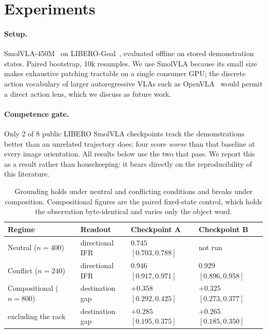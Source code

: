\documentclass{article}
\begin{document}
\section{Experiments}
\label{sec:exp}

\paragraph{Setup.} SmolVLA-450M~\citep{smolvla} on LIBERO-Goal~\citep{libero}, evaluated
offline on stored demonstration states. Paired bootstrap, 10k resamples. We use SmolVLA
because its small size makes exhaustive patching tractable on a single consumer GPU; the
discrete action vocabulary of larger autoregressive VLAs such as
OpenVLA~\citep{openvla} would permit a direct action lens, which we discuss as future work.

\paragraph{Competence gate.} Only 2 of 8 public LIBERO SmolVLA checkpoints track the
demonstrations better than an unrelated trajectory does; four score \emph{worse} than that
baseline at every image orientation. All results below use the two that pass. We report this as
a result rather than housekeeping: it bears directly on the reproducibility of this literature.

\begin{table}[t]
\caption{Grounding holds under neutral and conflicting conditions and breaks under composition.
Compositional figures are the paired fixed-state control, which holds the observation
byte-identical and varies only the object word.}
\label{tab:regimes}
\centering
\begin{tabular}{llll}
\toprule
Regime & Readout & Checkpoint A & Checkpoint B \\
\midrule
Neutral ($n{=}400$)        & directional IFR & $0.745$ $[0.703, 0.788]$ & not run \\
Conflict ($n{=}240$)       & directional IFR & $0.946$ $[0.917, 0.971]$ & $0.929$ $[0.896, 0.958]$ \\
Compositional ($n{=}800$)  & destination gap & $+0.358$ $[0.292, 0.425]$ & $+0.325$ $[0.273, 0.377]$ \\
\quad excluding the rack   & destination gap & $+0.285$ $[0.195, 0.375]$ & $+0.265$ $[0.185, 0.350]$ \\
\bottomrule
\end{tabular}
\end{table}
\end{document}
